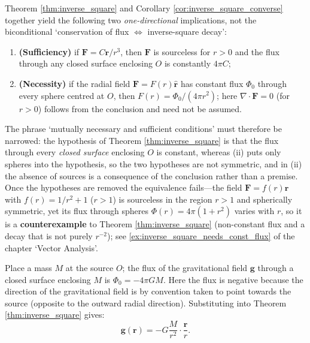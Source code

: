\begin{remark}\label{rem:inverse_square_converse_scope}
Theorem \ref{thm:inverse_square} and Corollary \ref{cor:inverse_square_converse} together yield the following two \emph{one-directional} implications, not the biconditional `conservation of flux $\iff$ inverse-square decay':
\begin{enumerate}[label=(\roman*)]
    \item \textbf{(Sufficiency)} if $\mathbf{F}=C\mathbf{r}/r^3$, then $\mathbf F$ is sourceless for $r>0$ and the flux through any closed surface enclosing $O$ is constantly $4\pi C$;
    \item \textbf{(Necessity)} if the radial field $\mathbf{F}=F(r)\hat{\mathbf{r}}$ has constant flux $\Phi_0$ through every sphere centred at $O$, then $F(r)=\Phi_0/(4\pi r^2)$; here $\nabla\cdot\mathbf F=0$ (for $r>0$) follows from the conclusion and need not be assumed.
\end{enumerate}
The phrase `mutually necessary and sufficient conditions' must therefore be narrowed: the hypothesis of Theorem \ref{thm:inverse_square} is that the flux through every \emph{closed surface} enclosing $O$ is constant, whereas (ii) puts only spheres into the hypothesis, so the two hypotheses are not symmetric, and in (ii) the absence of sources is a consequence of the conclusion rather than a premise. Once the hypotheses are removed the equivalence fails---the field $\mathbf F=f(r)\hat{\mathbf r}$ with $f(r)=1/r^2+1$ ($r>1$) is sourceless in the region $r>1$ and spherically symmetric, yet its flux through spheres $\Phi(r)=4\pi(1+r^2)$ varies with $r$, so it is a \textbf{counterexample} to Theorem \ref{thm:inverse_square} (non-constant flux and a decay that is not purely $r^{-2}$); see \cref{ex:inverse_square_needs_const_flux} of the chapter `Vector Analysis'.
\end{remark}

\begin{example}
Place a mass $M$ at the source $O$; the flux of the gravitational field $\mathbf{g}$ through a closed surface enclosing $M$ is $\Phi_0 = -4\pi GM$. Here the flux is negative because the direction of the gravitational field is by convention taken to point towards the source (opposite to the outward radial direction). Substituting into Theorem \ref{thm:inverse_square} gives:
\[\mathbf{g}(\mathbf{r}) = -G \frac{M}{r^2} \cdot \frac{\mathbf{r}}{r}.\]
\end{example}


